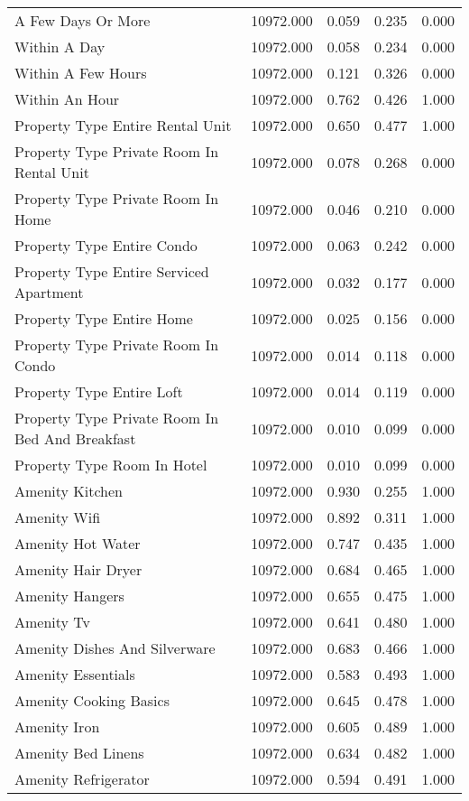 \begin{tabular}{lllll}
A Few Days Or More & 10972.000 & 0.059 & 0.235 & 0.000 \\
Within A Day & 10972.000 & 0.058 & 0.234 & 0.000 \\
Within A Few Hours & 10972.000 & 0.121 & 0.326 & 0.000 \\
Within An Hour & 10972.000 & 0.762 & 0.426 & 1.000 \\
Property Type Entire Rental Unit & 10972.000 & 0.650 & 0.477 & 1.000 \\
Property Type Private Room In Rental Unit & 10972.000 & 0.078 & 0.268 & 0.000 \\
Property Type Private Room In Home & 10972.000 & 0.046 & 0.210 & 0.000 \\
Property Type Entire Condo & 10972.000 & 0.063 & 0.242 & 0.000 \\
Property Type Entire Serviced Apartment & 10972.000 & 0.032 & 0.177 & 0.000 \\
Property Type Entire Home & 10972.000 & 0.025 & 0.156 & 0.000 \\
Property Type Private Room In Condo & 10972.000 & 0.014 & 0.118 & 0.000 \\
Property Type Entire Loft & 10972.000 & 0.014 & 0.119 & 0.000 \\
Property Type Private Room In Bed And Breakfast & 10972.000 & 0.010 & 0.099 & 0.000 \\
Property Type Room In Hotel & 10972.000 & 0.010 & 0.099 & 0.000 \\
Amenity Kitchen & 10972.000 & 0.930 & 0.255 & 1.000 \\
Amenity Wifi & 10972.000 & 0.892 & 0.311 & 1.000 \\
Amenity Hot Water & 10972.000 & 0.747 & 0.435 & 1.000 \\
Amenity Hair Dryer & 10972.000 & 0.684 & 0.465 & 1.000 \\
Amenity Hangers & 10972.000 & 0.655 & 0.475 & 1.000 \\
Amenity Tv & 10972.000 & 0.641 & 0.480 & 1.000 \\
Amenity Dishes And Silverware & 10972.000 & 0.683 & 0.466 & 1.000 \\
Amenity Essentials & 10972.000 & 0.583 & 0.493 & 1.000 \\
Amenity Cooking Basics & 10972.000 & 0.645 & 0.478 & 1.000 \\
Amenity Iron & 10972.000 & 0.605 & 0.489 & 1.000 \\
Amenity Bed Linens & 10972.000 & 0.634 & 0.482 & 1.000 \\
Amenity Refrigerator & 10972.000 & 0.594 & 0.491 & 1.000 \\

\end{tabular}
